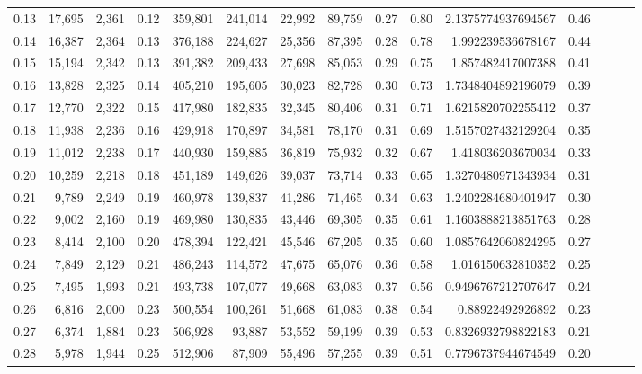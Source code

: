\begin{tabular}{rrrrrrrrrrrrrrr}
0.13 &  17,695 &  2,361 &  0.12 &  359,801 &  241,014 &   22,992 &   89,759 &  0.27 &  0.80 &     2.1375774937694567 &      0.46 \\
0.14 &  16,387 &  2,364 &  0.13 &  376,188 &  224,627 &   25,356 &   87,395 &  0.28 &  0.78 &      1.992239536678167 &      0.44 \\
0.15 &  15,194 &  2,342 &  0.13 &  391,382 &  209,433 &   27,698 &   85,053 &  0.29 &  0.75 &      1.857482417007388 &      0.41 \\
0.16 &  13,828 &  2,325 &  0.14 &  405,210 &  195,605 &   30,023 &   82,728 &  0.30 &  0.73 &     1.7348404892196079 &      0.39 \\
0.17 &  12,770 &  2,322 &  0.15 &  417,980 &  182,835 &   32,345 &   80,406 &  0.31 &  0.71 &     1.6215820702255412 &      0.37 \\
0.18 &  11,938 &  2,236 &  0.16 &  429,918 &  170,897 &   34,581 &   78,170 &  0.31 &  0.69 &     1.5157027432129204 &      0.35 \\
0.19 &  11,012 &  2,238 &  0.17 &  440,930 &  159,885 &   36,819 &   75,932 &  0.32 &  0.67 &      1.418036203670034 &      0.33 \\
0.20 &  10,259 &  2,218 &  0.18 &  451,189 &  149,626 &   39,037 &   73,714 &  0.33 &  0.65 &     1.3270480971343934 &      0.31 \\
0.21 &   9,789 &  2,249 &  0.19 &  460,978 &  139,837 &   41,286 &   71,465 &  0.34 &  0.63 &     1.2402284680401947 &      0.30 \\
0.22 &   9,002 &  2,160 &  0.19 &  469,980 &  130,835 &   43,446 &   69,305 &  0.35 &  0.61 &     1.1603888213851763 &      0.28 \\
0.23 &   8,414 &  2,100 &  0.20 &  478,394 &  122,421 &   45,546 &   67,205 &  0.35 &  0.60 &     1.0857642060824295 &      0.27 \\
0.24 &   7,849 &  2,129 &  0.21 &  486,243 &  114,572 &   47,675 &   65,076 &  0.36 &  0.58 &      1.016150632810352 &      0.25 \\
0.25 &   7,495 &  1,993 &  0.21 &  493,738 &  107,077 &   49,668 &   63,083 &  0.37 &  0.56 &     0.9496767212707647 &      0.24 \\
0.26 &   6,816 &  2,000 &  0.23 &  500,554 &  100,261 &   51,668 &   61,083 &  0.38 &  0.54 &       0.88922492926892 &      0.23 \\
0.27 &   6,374 &  1,884 &  0.23 &  506,928 &   93,887 &   53,552 &   59,199 &  0.39 &  0.53 &     0.8326932798822183 &      0.21 \\
0.28 &   5,978 &  1,944 &  0.25 &  512,906 &   87,909 &   55,496 &   57,255 &  0.39 &  0.51 &     0.7796737944674549 &      0.20 \\

\end{tabular}
